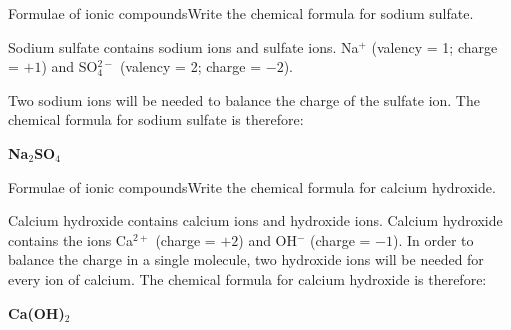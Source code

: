 \begin{wex}{Formulae of ionic compounds}{Write the chemical formula for sodium sulfate.}{
Sodium sulfate contains sodium ions and sulfate ions.
Na$^+$ (valency = 1; charge = $+1$) and SO$_4^{2-}$ (valency = 2; charge = $-2$).

Two sodium ions will be needed to balance the charge of the sulfate ion. The chemical formula for sodium sulfate is therefore:

\begin{center}
\textbf{Na$_2$SO$_4$}
\end{center}}
\end{wex}

\begin{wex}{Formulae of ionic compounds}{Write the chemical formula for calcium hydroxide.}{
Calcium hydroxide contains calcium ions and hydroxide ions.
Calcium hydroxide contains the ions Ca$^{2+}$ (charge = $+2$) and OH$^-$ (charge = $-1$). In order to balance the charge in a single molecule, two hydroxide ions will be needed for every ion of calcium.
The chemical formula for calcium hydroxide is therefore:

\begin{center}
\textbf{Ca(OH)$_2$}
\end{center}}
\end{wex}

